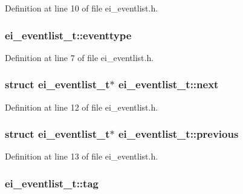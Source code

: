 Definition at line 10 of file ei\+\_\+eventlist.\+h.

\hypertarget{structei__eventlist__t_a0a2abf95b8cb56efa45ef9bcb521132b}{
\subsubsection[{eventtype}]{ ei\+\_\+eventlist\+\_\+t\+::eventtype}}\label{structei__eventlist__t_a0a2abf95b8cb56efa45ef9bcb521132b}


Definition at line 7 of file ei\+\_\+eventlist.\+h.

\hypertarget{structei__eventlist__t_a4672ce57c73628dd5ecb645691e0ff26}{
\subsubsection[{next}]{\setlength{\rightskip}{0pt plus 5cm}struct {\bf ei\+\_\+eventlist\+\_\+t}$\ast$ ei\+\_\+eventlist\+\_\+t\+::next}}\label{structei__eventlist__t_a4672ce57c73628dd5ecb645691e0ff26}


Definition at line 12 of file ei\+\_\+eventlist.\+h.

\hypertarget{structei__eventlist__t_ad114c93968018e8fce16f0a32da105aa}{
\subsubsection[{previous}]{\setlength{\rightskip}{0pt plus 5cm}struct {\bf ei\+\_\+eventlist\+\_\+t}$\ast$ ei\+\_\+eventlist\+\_\+t\+::previous}}\label{structei__eventlist__t_ad114c93968018e8fce16f0a32da105aa}


Definition at line 13 of file ei\+\_\+eventlist.\+h.

\hypertarget{structei__eventlist__t_a8827122ccd2ab2def51be82dc3e75aad}{
\subsubsection[{tag}]{ ei\+\_\+eventlist\+\_\+t\+::tag}}\label{structei__eventlist__t_a8827122ccd2ab2def51be82dc3e75aad}


